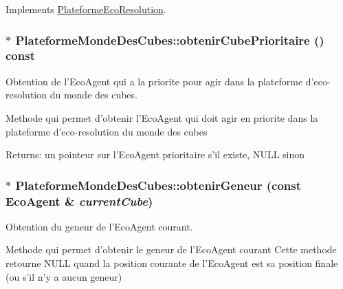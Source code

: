 Implements \hyperlink{classPlateformeEcoResolution_57d87139f09ca51cd6a4fa7cd2e83351}{PlateformeEcoResolution}.\hypertarget{classPlateformeMondeDesCubes_5f3ebe8acdfdbb447c13de8d3cbac438}{
\subsubsection[{obtenirCubePrioritaire}]{ $\ast$ PlateformeMondeDesCubes::obtenirCubePrioritaire () const}}
\label{classPlateformeMondeDesCubes_5f3ebe8acdfdbb447c13de8d3cbac438}


Obtention de l'EcoAgent qui a la priorite pour agir dans la plateforme d'eco-resolution du monde des cubes. 

Methode qui permet d'obtenir l'EcoAgent qui doit agir en priorite dans la plateforme d'eco-resolution du monde des cubes

\begin{Desc}
\item[Returns:]un pointeur sur l'EcoAgent prioritaire s'il existe, NULL sinon \end{Desc}
\hypertarget{classPlateformeMondeDesCubes_fd0d16680115dc57d5a43f433dde3592}{
\subsubsection[{obtenirGeneur}]{ $\ast$ PlateformeMondeDesCubes::obtenirGeneur (const {\bf EcoAgent} \& {\em currentCube})}}
\label{classPlateformeMondeDesCubes_fd0d16680115dc57d5a43f433dde3592}


Obtention du geneur de l'EcoAgent courant. 

Methode qui permet d'obtenir le geneur de l'EcoAgent courant Cette methode retourne NULL quand la position courante de l'EcoAgent est sa position finale (ou s'il n'y a aucun geneur)

